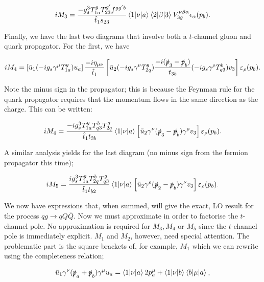 \begin{equation}
iM_3 = \frac{-g_s^3 T^g_{1a} T^{g'}_{23} f^{g g' b}}{\hat{t}_1 s_{23}}  \mathinner{\langle1\vert\nu\vert a\rangle}_{} \mathinner{\langle2\vert\beta\vert3\rangle}_{} V_{3g}^{\nu \beta \alpha}\epsilon_\alpha(p_b).
\end{equation}

Finally, we have the last two diagrams that involve both a $t$-channel gluon and quark propagator. For the first, we have 

\begin{equation}
iM_4 = \left[\bar{u}_1 (-i g_s \gamma^\mu T^g_{1a}) u_a \right] \frac{-i \eta_{\mu \nu}}{\hat{t}_1} \left[\bar{u}_2 (-i g_s \gamma^\nu T^g_{2q}) \frac{-i (\slashed{p}_3 - \slashed{p}_b )}{t_{3b}} (-i g_s \gamma^\rho T^b_{q3})v_3 \right] \varepsilon_\rho (p_b).
\end{equation}

Note the minus sign in the propagator; this is because the Feynman rule for the quark propagator requires that the momentum flows in the same direction as the charge. This can be written:

\begin{equation}
iM_4 = \frac{-i g_s^3 T^g_{1a}T^b_{q3}T^g_{2q}}{\hat{t}_1 t_{3b}} \mathinner{\langle1\vert\nu\vert a\rangle}_{}\left[\bar{u}_2 \gamma^\nu (\slashed{p}_3 - \slashed{p}_b) \gamma^\rho v_3 \right] \varepsilon_\rho (p_b).
\end{equation}

A similar analysis yields for the last diagram (no minus sign from the fermion propagator this time);

\begin{equation}
iM_5 = \frac{i g_s^3 T^g_{1a}T^b_{2q}T^g_{q3}}{\hat{t}_1 t_{b2}} \mathinner{\langle1\vert\nu\vert a\rangle}_{}\left[\bar{u}_2 \gamma^\rho (\slashed{p}_2 - \slashed{p}_b) \gamma^\nu v_3 \right] \varepsilon_\rho (p_b).
\end{equation}

We now have expressions that, when summed, will give the exact, LO result for the process $qg \to qQ\bar{Q}$. Now we must approximate in order to factorise the $t$-channel pole. No approximation is required for $M_3, M_4$ or $M_5$ since the $t$-channel pole is immediately explicit. $M_1$ and $M_2$, however, need special attention. The problematic part is the square brackets of, for example, $M_1$ which we can rewrite using the completeness relation;

\begin{equation}
\bar{u}_1 \gamma^\nu (\slashed{p}_a + \slashed{p}_b) \gamma^\mu u_a = \mathinner{\langle1\vert\nu\vert a\rangle}_{}2 p_a^\mu + \mathinner{\langle1\vert\nu\vert b\rangle}_{} \mathinner{\langle b\vert\mu\vert a\rangle}_{},
\end{equation}


